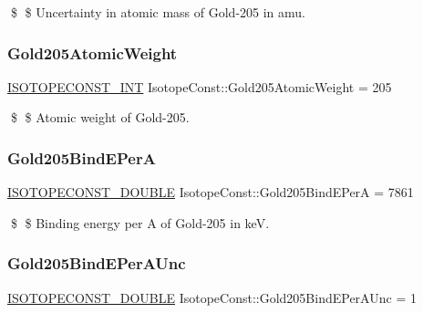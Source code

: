 \$ \$ Uncertainty in atomic mass of Gold-\/205 in amu. \mbox{\label{group___isotope_const-_gold-_au205_ga7995ea2b38975a657b24c59dc81e6c46}} 
\subsubsection{\texorpdfstring{Gold205\+Atomic\+Weight}{Gold205AtomicWeight}}
{\footnotesize\ttfamily \mbox{\hyperlink{group___isotope_const-_macros_ga5f18360b3e99483a35c32d789e62621c}{I\+S\+O\+T\+O\+P\+E\+C\+O\+N\+S\+T\+\_\+\+I\+NT}} Isotope\+Const\+::\+Gold205\+Atomic\+Weight = 205}

\$ \$ Atomic weight of Gold-\/205. \mbox{\label{group___isotope_const-_gold-_au205_ga3728812ba8836783531118c6ff260647}} 
\subsubsection{\texorpdfstring{Gold205\+Bind\+E\+PerA}{Gold205BindEPerA}}
{\footnotesize\ttfamily \mbox{\hyperlink{group___isotope_const-_macros_ga8f45a7272ce02c0b4c65c44636ed719a}{I\+S\+O\+T\+O\+P\+E\+C\+O\+N\+S\+T\+\_\+\+D\+O\+U\+B\+LE}} Isotope\+Const\+::\+Gold205\+Bind\+E\+PerA = 7861}

\$ \$ Binding energy per A of Gold-\/205 in keV. \mbox{\label{group___isotope_const-_gold-_au205_gae8c2e3bad16a5fc51e61ef628a6cdc80}} 
\subsubsection{\texorpdfstring{Gold205\+Bind\+E\+Per\+A\+Unc}{Gold205BindEPerAUnc}}
{\footnotesize\ttfamily \mbox{\hyperlink{group___isotope_const-_macros_ga8f45a7272ce02c0b4c65c44636ed719a}{I\+S\+O\+T\+O\+P\+E\+C\+O\+N\+S\+T\+\_\+\+D\+O\+U\+B\+LE}} Isotope\+Const\+::\+Gold205\+Bind\+E\+Per\+A\+Unc = 1}

